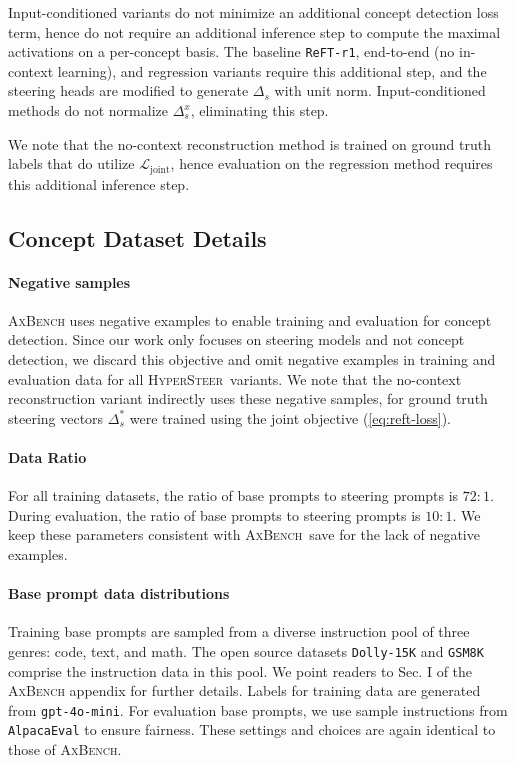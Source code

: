 \documentclass[11pt]{article}
\newcommand{\methodname}{\textsc{HyperSteer}}
\newcommand{\gpt}{\texttt{gpt-4o-mini}}
\begin{document}
Input-conditioned variants do not minimize an additional concept detection loss term, hence do not require an additional inference step to compute the maximal activations on a per-concept basis. The baseline \texttt{ReFT-r1}, end-to-end (no in-context learning), and regression variants require this additional step, and the steering heads are modified to generate $\Delta_s$ with unit norm. Input-conditioned methods do not normalize $\Delta_s^x$, eliminating this step.

We note that the no-context reconstruction method is trained on ground truth labels that do utilize $\mathcal L_\mathrm{joint}$, hence evaluation on the regression method requires this additional inference step.

\subsection{Concept Dataset Details}
\label{appendix:data}

\paragraph{Negative samples} \textsc{AxBench} uses negative examples to enable training and evaluation for concept detection. Since our work only focuses on steering models and not concept detection, we discard this objective and omit negative examples in training and evaluation data for all \methodname\ variants. We note that the no-context reconstruction variant indirectly uses these negative samples, for ground truth steering vectors $\Delta_s^*$ were trained using the joint objective (\ref{eq:reft-loss}).

\paragraph{Data Ratio} For all training datasets, the ratio of base prompts to steering prompts is $72:1$. During evaluation, the ratio of base prompts to steering prompts is $10:1$. We keep these parameters consistent with \textsc{AxBench}\ save for the lack of negative examples.

\paragraph{Base prompt data distributions} Training base prompts are sampled from a diverse instruction pool of three genres: code, text, and math. The open source datasets \texttt{Dolly-15K} \cite{DatabricksBlog2023DollyV2} and \texttt{GSM8K} \cite{cobbe2021gsm8k} comprise the instruction data in this pool. We point readers to Sec. I of the \textsc{AxBench} appendix for further details. Labels for training data are generated from \gpt. For evaluation base prompts, we use sample instructions from \texttt{AlpacaEval} \cite{alpaca_eval} to ensure fairness. These settings and choices are again identical to those of \textsc{AxBench}.
\end{document}
